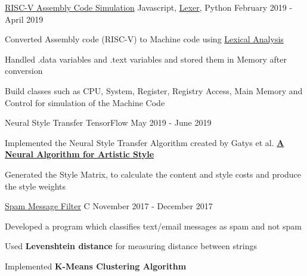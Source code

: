 \begin{cventries}
    \projects
    {} %
    {\href{https://github.com/vinx-2105/assembly-simulator}{RISC-V Assembly Code Simulation}} %
    {Javascript, \href{https://github.com/aaditmshah/lexer}{Lexer}, Python} %
    {February 2019 - April 2019} %
    {
      \begin{cvitems} %
        \item {Converted Assembly code (RISC-V) to Machine code using \href{https://github.com/aaditmshah/lexer}{Lexical Analysis}}
        \item {Handled .data variables and .text variables and stored them in Memory after conversion}
        \item {Build classes such as CPU, System, Register, Registry Access, Main Memory and Control for simulation of the Machine Code}
      \end{cvitems}
      }
      
      \projects
    {} %
    {{Neural Style Transfer}} %
    {TensorFlow} %
    {May 2019 - June 2019} %
    {
      \begin{cvitems} %
        \item {Implemented the Neural Style Transfer Algorithm created by Gatys et al. \href{https://arxiv.org/abs/1508.06576}{\textbf{A Neural Algorithm for Artistic Style}}}
        \item {Generated the Style Matrix, to calculate the content and style costs and produce the style weights}
      \end{cvitems}
    }
      
      \projects
      {} %
      {\href{https://github.com/parthgoyal123/Queen-McCluskey}{Spam Message Filter}} %
      {C} %
      {November 2017 - December 2017} %
      {
        \begin{cvitems} %
          \item {Developed a program which classifies text/email messages as spam and not spam}
          \item {Used \textbf{Levenshtein distance} for measuring distance between strings} 
          \item {Implemented \textbf{K-Means Clustering Algorithm}}
        \end{cvitems}
        }


\end{cventries}
